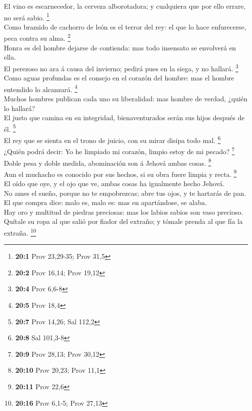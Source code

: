  El vino es escarnecedor, la cerveza alborotadora; y
cualquiera que por ello errare, no será sabio. \footnote{\textbf{20:1}
  Prov 23,29-35; Prov 31,5}\\
 Como bramido de cachorro de león es el terror del rey: el
que lo hace enfurecerse, peca contra su alma. \footnote{\textbf{20:2}
  Prov 16,14; Prov 19,12}\\
 Honra es del hombre dejarse de contienda: mas todo
insensato se envolverá en ella.\\
 El perezoso no ara á causa del invierno; pedirá pues en la
siega, y no hallará. \footnote{\textbf{20:4} Prov 6,6-8}\\
 Como aguas profundas es el consejo en el corazón del
hombre: mas el hombre entendido lo alcanzará. \footnote{\textbf{20:5}
  Prov 18,4}\\
 Muchos hombres publican cada uno su liberalidad: mas hombre
de verdad, ¿quién lo hallará?\\
 El justo que camina en su integridad, bienaventurados serán
sus hijos después de él. \footnote{\textbf{20:7} Prov 14,26; Sal 112,2}\\
 El rey que se sienta en el trono de juicio, con su mirar
disipa todo mal. \footnote{\textbf{20:8} Sal 101,3-8}\\
 ¿Quién podrá decir: Yo he limpiado mi corazón, limpio estoy
de mi pecado? \footnote{\textbf{20:9} Prov 28,13; Prov 30,12}\\
 Doble pesa y doble medida, abominación son á Jehová ambas
cosas. \footnote{\textbf{20:10} Prov 20,23; Prov 11,1}\\
 Aun el muchacho es conocido por sus hechos, si su obra
fuere limpia y recta. \footnote{\textbf{20:11} Prov 22,6}\\
 El oído que oye, y el ojo que ve, ambas cosas ha
igualmente hecho Jehová.\\
 No ames el sueño, porque no te empobrezcas; abre tus ojos,
y te hartarás de pan.\\
 El que compra dice: malo es, malo es: mas en apartándose,
se alaba.\\
 Hay oro y multitud de piedras preciosas: mas los labios
sabios son vaso precioso.\\
 Quítale su ropa al que salió por fiador del extraño; y
tómale prenda al que fía la extraña. \footnote{\textbf{20:16} Prov
  6,1-5; Prov 27,13}\\
